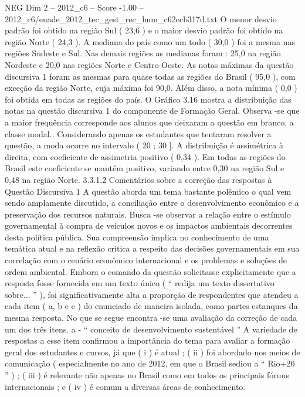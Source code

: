 \begin{textsample}{NEG Dim 2 – 2012\_c6 – Score -1.00 – 2012\_c6/enade\_2012\_tec\_gest\_rec\_hum\_c62ecb317d.txt}
O menor desvio padrão foi obtido na região Sul ( 23,6 ) e o maior desvio padrão foi obtido na região Norte ( 24,3 ).
A mediana do país como um todo ( 30,0 ) foi a mesma nas regiões Sudeste e Sul.
Nas demais regiões as medianas foram : 25,0 na região Nordeste e 20,0 nas regiões Norte e Centro-Oeste.
As notas máximas da questão discursiva 1 foram as mesmas para quase todas as regiões do Brasil ( 95,0 ), com exceção da região Norte, cuja máxima foi 90,0.
Além disso, a nota mínima ( 0,0 ) foi obtida em todas as regiões do país.
O Gráfico 3.16 mostra a distribuição das notas na questão discursiva 1 do componente de Formação Geral.
Observa -se que a maior frequência corresponde aos alunos que deixaram a questão em branco, a classe modal..
Considerando apenas os estudantes que tentaram resolver a questão, a moda ocorre no intervalo ( 20 ; 30 ].
A distribuição é assimétrica à direita, com coeficiente de assimetria positivo ( 0,34 ).
Em todas as regiões do Brasil este coeficiente se mantém positivo, variando entre 0,30 na região Sul e 0,48 na região Norte. 3.3.1.2 Comentários sobre a correção das respostas à Questão Discursiva 1 A questão aborda um tema bastante polêmico o qual vem sendo amplamente discutido, a conciliação entre o desenvolvimento econômico e a preservação dos recursos naturais.
Busca -se observar a relação entre o estímulo governamental à compra de veículos novos e os impactos ambientais decorrentes desta política pública.
Sua compreensão implica no conhecimento de uma temática atual e na reflexão critica a respeito das decisões governamentais em sua correlação com o cenário econômico internacional e os problemas e soluções de ordem ambiental.
Embora o comando da questão solicitasse explicitamente que a resposta fosse fornecida em um texto único ( “ redija um texto dissertativo sobre... ” ), foi significativamente alta a proporção de respondentes que atendeu a cada item ( a, b e c ) do enunciado de maneira isolada, como partes estanques da mesma resposta.
No que se segue encontra -se uma avaliação da correção de cada um dos três itens. a - “ conceito de desenvolvimento sustentável ” A variedade de respostas a esse item confirmou a importância do tema para avaliar a formação geral dos estudantes e cursos, já que ( i ) é atual ; ( ii ) foi abordado nos meios de comunicação ( especialmente no ano de 2012, em que o Brasil sediou a “ Rio+20 ” ) ; ( iii ) é relevante não apenas no Brasil como em todos os principais fóruns internacionais ; e ( iv ) é comum a diversas áreas de conhecimento.

\end{textsample}
